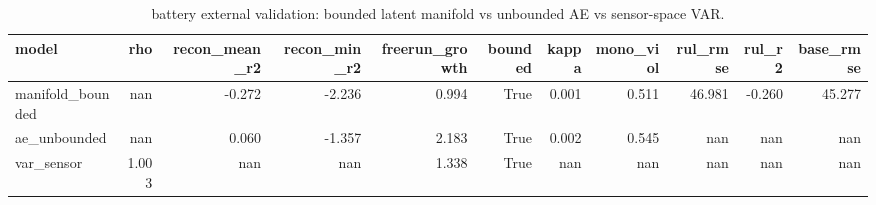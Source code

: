 \begin{table}[t]
\centering
\caption{battery external validation: bounded latent manifold vs unbounded AE vs sensor-space VAR.}
\label{tab:battery}
\begin{tabular}{lrrrrrrrrrr}
\toprule
model & rho & recon\_mean\_r2 & recon\_min\_r2 & freerun\_growth & bounded & kappa & mono\_viol & rul\_rmse & rul\_r2 & base\_rmse \\
\midrule
manifold\_bounded & nan & -0.272 & -2.236 & 0.994 & True & 0.001 & 0.511 & 46.981 & -0.260 & 45.277 \\
ae\_unbounded & nan & 0.060 & -1.357 & 2.183 & True & 0.002 & 0.545 & nan & nan & nan \\
var\_sensor & 1.003 & nan & nan & 1.338 & True & nan & nan & nan & nan & nan \\
\bottomrule
\end{tabular}
\end{table}